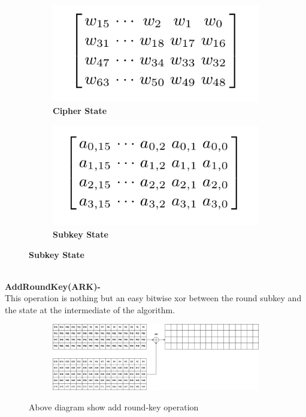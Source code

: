 \documentclass[journal=tosc,preprint]{iacrtrans}
\begin{document}
\begin{figure}[h!]
    \centering
    \begin{subfigure}[b]{0.45\textwidth} %
        \centering
        \includegraphics[width=\textwidth]{Screenshot 2024-11-30 124138.png}
        \caption*{\textbf{Cipher State}}
        \label{fig:image1}
    \end{subfigure}
    \hfill %
    \begin{subfigure}[b]{0.45\textwidth} %
        \centering
        \includegraphics[width=\textwidth]{Screenshot 2024-11-30 124153.png}
        \caption*{\textbf{Subkey State}}
        \label{fig:image2}
    \end{subfigure}
    \label{fig:images}
\end{figure}
\\
\textbf{AddRoundKey(ARK)-}\\
This operation is nothing but an easy bitwise xor between
 the round subkey and the state at the intermediate of the algorithm.\\
 \begin{figure}[h!]
    \centering
    \begin{subfigure}[b]{1.2\textwidth}
        \centering
        \includegraphics[width=\textwidth]{SKCrypto.drawio.png} 
        \label{fig:image1}
    \end{subfigure}
    \caption{Above diagram show add round-key operation}

\end{figure}
\end{document}
